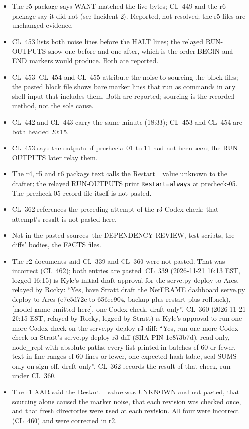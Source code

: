 \documentclass[10pt]{article}
\newcommand{\CL}[1]{CL~#1}
\begin{document}
\begin{itemize}[leftmargin=1.5em,itemsep=0.1em]
\item The r5 package says WANT matched the live bytes; \CL{449} and the r6 package say it did not (see Incident 2). Reported, not resolved; the r5 files are unchanged evidence.
\item \CL{453} lists both noise lines before the HALT lines; the relayed RUN-OUTPUTS show one before and one after, which is the order BEGIN and END markers would produce. Both are reported.
\item \CL{453}, \CL{454} and \CL{455} attribute the noise to sourcing the block files; the pasted block file shows bare marker lines that run as commands in any shell input that includes them. Both are reported; sourcing is the recorded method, not the sole cause.
\item \CL{442} and \CL{443} carry the same minute (18:33); \CL{453} and \CL{454} are both headed 20:15.
\item \CL{453} says the outputs of prechecks 01 to 11 had not been seen; the RUN-OUTPUTS later relay them.
\item The r4, r5 and r6 package text calls the Restart= value unknown to the drafter; the relayed RUN-OUTPUTS print \texttt{Restart=always} at precheck-05. The precheck-05 record file itself is not pasted.
\item \CL{362} references the preceding attempt of the r3 Codex check; that attempt's result is not pasted here.
\item Not in the pasted sources: the DEPENDENCY-REVIEW, test scripts, the diffs' bodies, the FACTS files.
\item The r2 documents said \CL{339} and \CL{360} were not pasted. That was incorrect (\CL{462}); both entries are pasted. \CL{339} (2026-11-21 16:13 EST, logged 16:15) is Kyle's initial draft approval for the serve.py deploy to Ares, relayed by Rocky: ``Yes, have Stratt draft the NetFRAME dashboard serve.py deploy to Ares (e7c5d72c to 656ee904, backup plus restart plus rollback), [model name omitted here], one Codex check, draft only''. \CL{360} (2026-11-21 20:15 EST, relayed by Rocky, logged by Stratt) is Kyle's approval to run one more Codex check on the serve.py deploy r3 diff: ``Yes, run one more Codex check on Stratt's serve.py deploy r3 diff (SHA-PIN 1c873b7d), read-only, node\_repl with absolute paths, every list printed in batches of 60 or fewer, text in line ranges of 60 lines or fewer, one expected-hash table, seal SUMS only on sign-off, draft only''. \CL{362} records the result of that check, run under \CL{360}.
\item The r1 AAR said the Restart= value was UNKNOWN and not pasted, that sourcing alone caused the marker noise, that each revision was checked once, and that fresh directories were used at each revision. All four were incorrect (\CL{460}) and were corrected in r2.
\end{itemize}
\end{document}
